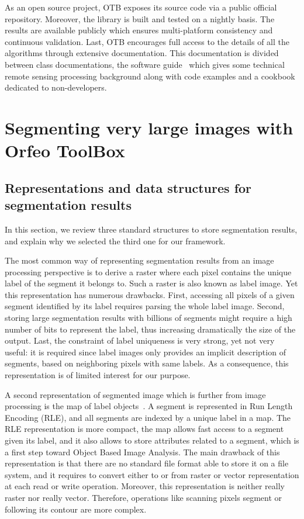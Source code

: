 \documentclass{josis}
\begin{document}
As an open source project, OTB exposes its source code via a public
official repository. Moreover, the library is built and tested on a
nightly basis. The results are available publicly which ensures
multi-platform consistency and continuous validation. Last, OTB
encourages full access to the details of all the algorithms through
extensive documentation. This documentation is divided between class
documentations, the software guide~\cite{otbSoftwareGuide} which gives
some technical remote sensing processing background along with code
examples and a cookbook~\cite{otbCookBook} dedicated to non-developers.

\section{Segmenting very large images with Orfeo ToolBox}\label{sec:seg}


\subsection{Representations and data structures for segmentation results}

In this section, we review three standard structures to store
segmentation results, and explain why we selected the third one for
our framework.

The most common way of representing segmentation results from an image
processing perspective is to derive a raster where each pixel contains
the unique label of the segment it belongs to. Such a raster is also
known as label image. Yet this representation has numerous
drawbacks. First, accessing all pixels of a given segment identified
by its label requires parsing the whole label image. Second, storing
large segmentation results with billions of segments might require a
high number of bits to represent the label, thus increasing
dramatically the size of the output. Last, the constraint of label
uniqueness is very strong, yet not very useful: it is required since
label images only provides an implicit description of segments, based
on neighboring pixels with same labels. As a consequence, this representation is of
limited interest for our purpose.

A second representation of segmented image which is further from image
processing is the map of label objects~\cite{lehmann2008label}. A segment is
represented in Run Length Encoding (RLE), and all segments are indexed by a
unique label in a map. The RLE representation is more compact, the map allows
fast access to a segment given its label, and it also allows to store attributes
related to a segment, which is a first step toward Object Based Image
Analysis. The main drawback of this representation is that there are no standard
file format able to store it on a file system, and it requires to convert either
to or from raster or vector representation at each read or write
operation. Moreover, this representation is neither really raster nor really
vector. Therefore, operations like scanning pixels segment or following its
contour are more complex.
\end{document}
